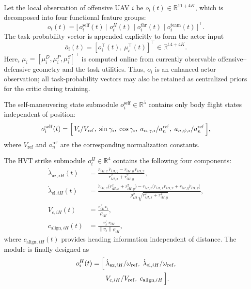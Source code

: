 \documentclass{cja}
\begin{document}
Let the local observation of offensive UAV $i$ be $o_i(t)\in\mathbb{R}^{11+4K}$, which is decomposed into four functional feature groups:
\begin{equation}
o_i(t)=\bigl[\,o_i^{\mathrm{self}}(t)\;\big|\;o_i^{H}(t)\;\big|\;o_i^{\mathrm{thr}}(t)\;\big|\;o_i^{\mathrm{team}}(t)\,\bigr]^{\top}.
\label{eq:obs-decomp}
\end{equation}
The task-probability vector is appended explicitly to form the actor input
\begin{equation}
\bar o_i(t)
=
\left[o_i^{\top}(t),\,\mu_i^{\top}(t)\right]^{\top}
\in\mathbb R^{14+4K}.
\end{equation}
Here, $\mu_i=[\mu_i^D,\mu_i^P,\mu_i^S]^{\top}$ is computed online from currently observable offensive--defensive geometry and the task utilities. Thus, $\bar o_i$ is an enhanced actor observation; all task-probability vectors may also be retained as centralized priors for the critic during training.

The self-maneuvering state submodule $o_i^{\mathrm{self}}\in\mathbb{R}^{5}$ contains only body flight states independent of position:
\begin{equation}
o_i^{\mathrm{self}}(t)=\Bigl[\,V_i/V_{\mathrm{ref}},\;\sin\gamma_i,\;\cos\gamma_i,\;a_{n,\gamma,i}/a^{\mathrm{ref}}_n,\;a_{n,\psi,i}/a^{\mathrm{ref}}_n\,\Bigr],
\label{eq:obs-self}
\end{equation}
where $V_{\mathrm{ref}}$ and $a^{\mathrm{ref}}_n$ are the corresponding normalization constants.

The HVT strike submodule $o_i^{H}\in\mathbb{R}^{4}$ contains the following four components:
\begin{align}
\dot\lambda_{\mathrm{az},iH}(t)&=\frac{r_{iH,x}\,\dot r_{iH,y}-r_{iH,y}\,\dot r_{iH,x}}{r_{iH,x}^{2}+r_{iH,y}^{2}},
\label{eq:los-az}\\
\dot\lambda_{\mathrm{el},iH}(t)&=\frac{\dot r_{iH,z}\bigl(r_{iH,x}^{2}+r_{iH,y}^{2}\bigr)
-r_{iH,z}\bigl(r_{iH,x}\dot r_{iH,x}+r_{iH,y}\dot r_{iH,y}\bigr)}{\rho_{iH}^{2}\,\sqrt{r_{iH,x}^{2}+r_{iH,y}^{2}}},
\label{eq:los-el}\\
V_{c,iH}(t)&=\frac{r_{iH}^{\top}v_i}{\rho_{iH}},
\label{eq:vc-h}\\
c_{\mathrm{align},iH}(t)&=\frac{v_i^{\top}r_{iH}}{\|v_i\|\,\rho_{iH}},
\label{eq:cos-align}
\end{align}
where $c_{\mathrm{align},iH}(t)$ provides heading information independent of distance. The module is finally designed as
\begin{equation}
\begin{aligned}
o_i^{H}(t)=\Bigl[\,&\dot\lambda_{\mathrm{az},iH}/\omega_{\mathrm{ref}},\;
\dot\lambda_{\mathrm{el},iH}/\omega_{\mathrm{ref}},\\
&V_{c,iH}/V_{\mathrm{ref}},\;c_{\mathrm{align},iH}\,\Bigr].
\end{aligned}
\end{equation}
\end{document}

